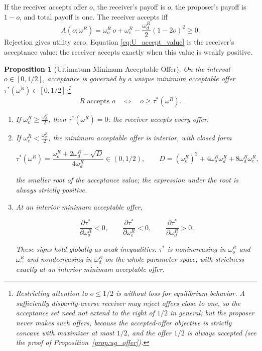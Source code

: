 \documentclass[11pt]{article}
\theoremstyle{plain}
\newtheorem{proposition}{Proposition}
\theoremstyle{remark}
\begin{document}
If the receiver accepts offer $o$, the receiver's payoff is $o$, the proposer's payoff is $1-o$, and total payoff is one.  The receiver accepts iff
\begin{equation}
\label{eq:U_accept_value}
        A(o;\omega^R)
        =
        \omega_o^R\,o
        +\omega_e^R
        -\frac{\omega_d^R}{2}(1-2o)^2
        \ge0.
\end{equation}
Rejection gives utility zero.  Equation \eqref{eq:U_accept_value} is the receiver's acceptance value: the receiver accepts exactly when this value is weakly positive.

\begin{proposition}[Ultimatum Minimum Acceptable Offer]
\label{prop:ug_mao}
On the interval $o\in[0,1/2]$, acceptance is governed by a unique minimum acceptable offer $\tau^\ast(\omega^R)\in[0,1/2]$:\footnote{Restricting attention to $o\le1/2$ is without loss for equilibrium behavior.  A sufficiently disparity-averse receiver may reject offers close to one, so the acceptance set need not extend to the right of $1/2$ in general; but the proposer never makes such offers, because the accepted-offer objective is strictly concave with maximizer at most $1/2$, and the offer $1/2$ is always accepted (see the proof of Proposition~\ref{prop:ug_offer}).}
\[
        R\text{ accepts }o
        \quad\Longleftrightarrow\quad
        o\ge \tau^\ast(\omega^R).
\]
\begin{enumerate}[topsep=2pt,itemsep=2pt]
\item If $\omega_e^R\ge \frac{\omega_d^R}{2}$, then $\tau^\ast(\omega^R)=0$: the receiver accepts every offer.
\item If $\omega_e^R< \frac{\omega_d^R}{2}$, the minimum acceptable offer is interior, with closed form
\begin{csbox}
\[
        \tau^\ast(\omega^R)
        =
        \frac{\omega_o^R+2\omega_d^R-\sqrt{D}}{4\omega_d^R}\in(0,1/2),
        \qquad
        D=(\omega_o^R)^2+4\omega_o^R\omega_d^R+8\omega_d^R\omega_e^R,
\]
\end{csbox}
the smaller root of the acceptance value; the expression under the root is always strictly positive.
\item At an interior minimum acceptable offer,
\begin{csbox}
\[
        \frac{\partial \tau^\ast}{\partial \omega_o^R}<0,
        \qquad
        \frac{\partial \tau^\ast}{\partial \omega_e^R}<0,
        \qquad
        \frac{\partial \tau^\ast}{\partial \omega_d^R}>0.
\]
\end{csbox}
These signs hold globally as weak inequalities: $\tau^\ast$ is nonincreasing in $\omega_o^R$ and $\omega_e^R$ and nondecreasing in $\omega_d^R$ on the whole parameter space, with strictness exactly at an interior minimum acceptable offer.
\end{enumerate}
\end{proposition}
\end{document}
